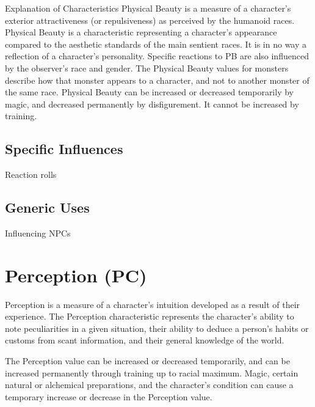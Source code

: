 \begin{Chapter}{Explanation of Characteristics}
Physical Beauty is a measure of a character’s exterior attractiveness
(or repulsiveness) as perceived by the humanoid races.  Physical
Beauty is a characteristic representing a character’s appearance
compared to the aesthetic standards of the main sentient races.  It is
in no way a reflection of a character’s personality.  Specific
reactions to PB are also influenced by the observer’s race and gender.
The Physical Beauty values for monsters describe how that monster
appears to a character, and not to another monster of the same
race. Physical Beauty can be increased or decreased temporarily by
magic, and decreased permanently by disfigurement. It cannot be
increased by training.

\subsection{Specific Influences}

\begin{Itemize}

\item Reaction rolls 

\end{Itemize}

\subsection{Generic Uses}

\begin{Itemize}

\item Influencing NPCs 

\end{Itemize}


\section{Perception (PC)}

Perception is a measure of a character’s intuition developed as a
result of their experience. The Perception characteristic represents
the character’s ability to note peculiarities in a given situation,
their ability to deduce a person’s habits or customs from scant
information, and their general knowledge of the world.

The Perception value can be increased or decreased temporarily, and
can be increased permanently through training up to racial maximum.
Magic, certain natural or alchemical preparations, and the character’s
condition can cause a temporary increase or decrease in the Perception
value.


\end{Chapter}
